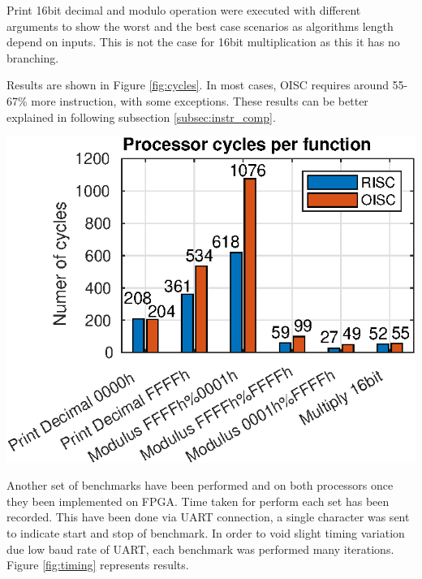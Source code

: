 Print 16bit decimal and modulo operation were executed with different arguments to show the worst and the best case scenarios as algorithms length depend on inputs. This is not the case for 16bit multiplication as this it has no branching. 

Results are shown in Figure \ref{fig:cycles}. In most cases, OISC requires around 55-67\% more instruction, with some exceptions. These results can be better explained in following subsection \ref{subsec:instr_comp}.

\begin{colfigure}
	\centering
	\includegraphics[width=\linewidth]{../tests/cycles.eps}
	\label{fig:cycles}
\end{colfigure}

Another set of benchmarks have been performed and on both processors once they been implemented on FPGA. Time taken for perform each set has been recorded. This have been done via UART connection, a single character was sent to indicate start and stop of benchmark. In order to void slight timing variation due low baud rate of UART, each benchmark was performed many iterations. Figure \ref{fig:timing} represents results.

